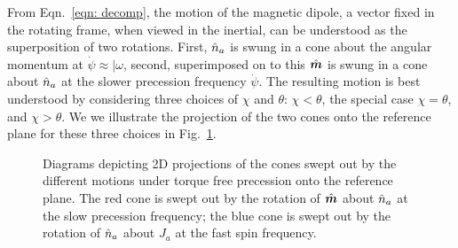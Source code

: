 \documentclass[../full_thesis/full_thesis.tex]{subfiles}
\begin{document}
From Eqn.~\eqref{eqn: decomp}, the motion of the magnetic dipole, a vector
fixed in the rotating frame, when viewed in the inertial, can be understood as
the superposition of two rotations. First, $\hat{n}_a$ is swung in a cone about the
angular momentum at $\dot{\psi} \approx |\omega$, second, superimposed on to
this $\hat{\boldsymbol{m}}$ is swung in a cone about $\hat{n}_a$ at the slower precession frequency
$\dot{\psi}$. The resulting motion is best understood by considering three
choices of $\chi$ and $\theta$: $\chi < \theta$, the special case $\chi =
\theta$, and $\chi > \theta$. We we illustrate the projection of the two
cones onto the reference plane for these three choices in Fig.~\ref{fig: cones}.
\begin{figure}[ht]
\centering
\caption{Diagrams depicting 2D projections of the cones swept out by the
    different motions under torque free precession onto the reference plane.
    The red cone is swept out by the rotation of $\hat{\boldsymbol{m}}$ about $\hat{n}_{a}$ at the
    slow precession frequency; the blue cone is swept out by the rotation of
    $\hat{n}_{a}$ about $J_a$ at the fast spin frequency.}
\label{fig: cones}
\end{figure}
\end{document}
